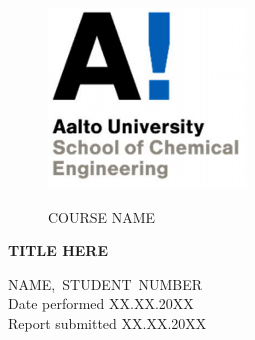 \documentclass[11pt]{article}
\begin{document}
\begin{titlepage}
\begin{figure}[t]
    \includegraphics[scale=1.2]{photos/School_of_Chemical_Engineering.png} %
    \vspace*{1cm}
    \begin{flushleft}
    {\fontsize{11}{10}\selectfont COURSE NAME} %
    \end{flushleft}
\end{figure}


\vspace*{4cm}

\begin{center}
\fontsize{16}{15}
\textbf{TITLE HERE} %
\end{center}

\vfill
\hfill\begin{minipage}{0.4\linewidth}
{\fontsize{11}{10}\selectfont
NAME, STUDENT NUMBER \\
\newline
Date performed %
\hfill XX.XX.20XX\\
Report submitted %
\hfill XX.XX.20XX \\
} %
\end{minipage}


\date{}

\end{titlepage}

\end{document}
